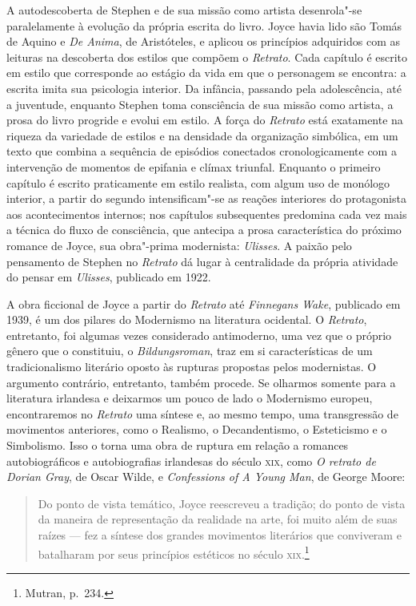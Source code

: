 A autodescoberta de Stephen e de sua missão como artista desenrola"-se
paralelamente à evolução da própria escrita do livro. Joyce havia lido
são Tomás de Aquino e \textit{De Anima}, de
Aristóteles, e aplicou os princípios adquiridos com as leituras na
descoberta dos estilos que compõem o \textit{Retrato}. Cada capítulo é
escrito em estilo que corresponde ao estágio da vida em que o
personagem se encontra: a escrita imita sua psicologia interior. Da
infância, passando pela adolescência, até a juventude, enquanto Stephen
toma consciência de sua missão como artista, a prosa do livro progride
e evolui em estilo. A força do \textit{Retrato} está exatamente na
riqueza da variedade de estilos e na densidade da organização
simbólica, em um texto que combina a sequência de episódios conectados
cronologicamente com a intervenção de momentos de epifania e clímax
triunfal. Enquanto o primeiro capítulo é escrito praticamente em estilo
realista, com algum uso de monólogo interior, a partir do segundo 
intensificam"-se as reações interiores do protagonista aos
acontecimentos internos; nos capítulos subsequentes predomina cada vez
mais a técnica do fluxo de consciência, que antecipa a prosa
característica do próximo romance de Joyce, sua obra"-prima modernista:
\textit{Ulisses}. A paixão pelo pensamento de Stephen no
\textit{Retrato} dá lugar à centralidade da própria atividade do pensar
em \textit{Ulisses}, publicado em 1922.  

A obra ficcional de Joyce a partir do \textit{Retrato} até
\textit{Finnegans Wake}, publicado em 1939, é um dos pilares do
Modernismo na literatura ocidental. O \textit{Retrato}, entretanto, foi
algumas vezes considerado antimoderno, uma vez que o próprio gênero
que o constituiu, o \textit{Bildungsroman}, traz em si características
de um tradicionalismo literário oposto às rupturas propostas pelos
modernistas. O argumento contrário, entretanto, também procede. Se
olharmos somente para a literatura irlandesa e deixarmos um pouco de
lado o Modernismo europeu, encontraremos no \textit{Retrato} uma
síntese e, ao mesmo tempo, uma transgressão de movimentos anteriores,
como o Realismo, o Decandentismo, o Esteticismo e o Simbolismo. Isso o
torna uma obra de ruptura em relação a romances autobiográficos e
autobiografias irlandesas do século \textsc{xix}, como \textit{O retrato de
Dorian Gray}, de Oscar Wilde, e \textit{Confessions of A Young Man}, de
George Moore: 

\begin{quote}
Do ponto de vista temático, Joyce reescreveu a tradição;
do ponto de vista da maneira de representação da realidade na arte, foi
muito além de suas raízes --- fez a síntese dos grandes movimentos
literários que conviveram e batalharam por seus princípios estéticos no
século \textsc{xix}.\footnote{ Mutran, p.~234.}
\end{quote}



